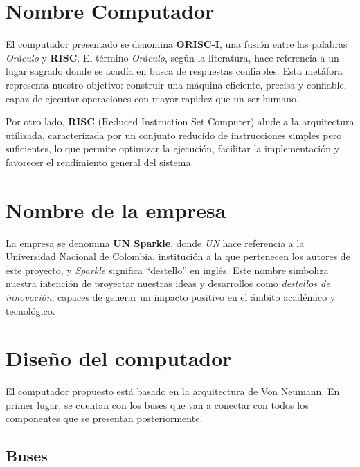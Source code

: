 \documentclass{article}
\begin{document}

\section{Nombre Computador}

El computador presentado se denomina \textbf{ORISC-I}, una fusión entre las 
palabras \textit{Oráculo} y \textbf{RISC}. El término \textit{Oráculo}, según 
la literatura, hace referencia a un lugar sagrado donde se acudía en busca de 
respuestas confiables. Esta metáfora representa nuestro objetivo: construir una 
máquina eficiente, precisa y confiable, capaz de ejecutar operaciones con mayor 
rapidez que un ser humano.

Por otro lado, \textbf{RISC} (Reduced Instruction Set Computer) alude a la 
arquitectura utilizada, caracterizada por un conjunto reducido de instrucciones 
simples pero suficientes, lo que permite optimizar la ejecución, facilitar la 
implementación y favorecer el rendimiento general del sistema.

\section{Nombre de la empresa}

La empresa se denomina \textbf{UN Sparkle}, donde \textit{UN} hace referencia a 
la Universidad Nacional de Colombia, institución a la que pertenecen los autores 
de este proyecto, y \textit{Sparkle} significa “destello” en inglés. Este nombre 
simboliza nuestra intención de proyectar nuestras ideas y desarrollos como 
\textit{destellos de innovación}, capaces de generar un impacto positivo en 
el ámbito académico y tecnológico.


\section{Diseño del computador}

El computador propuesto está basado en la arquitectura de Von Neumann.
En primer lugar, se cuentan con los buses que van a conectar con todos los componentes 
que se presentan posteriormente.

\subsection{Buses}
\end{document}
